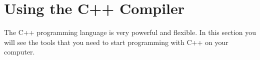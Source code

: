 \clearpage
\def\pageLang{c}
\section{Using the C++ Compiler} %
\label{sec:building_programs_in_c}

The C++ programming language is very powerful and flexible. In this section you will see the tools that you need to start programming with C++ on your computer.


